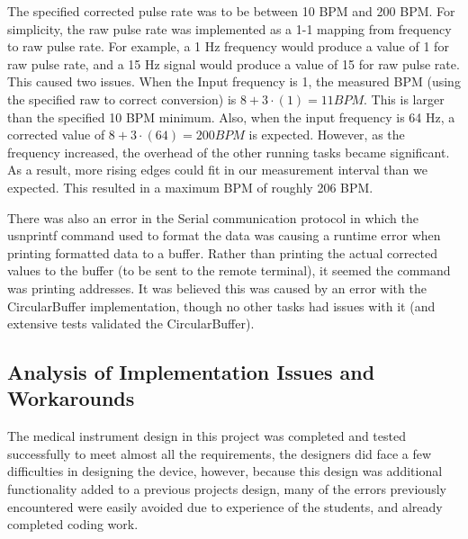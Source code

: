 \documentclass[12pt]{article} %
\begin{document}
    The specified corrected pulse rate was to be between 10 BPM and 200 BPM.
    For simplicity, the raw pulse rate was implemented as a 1-1 mapping from
    frequency to raw pulse rate.  For example, a 1 Hz frequency would produce a
    value of 1 for raw pulse rate, and a 15 Hz signal would produce a value of
    15 for raw pulse rate.  This caused two issues.  When the Input frequency
    is 1, the measured BPM (using the specified raw to correct conversion) is
    $8 + 3\cdot(1) = 11 BPM$.  This is larger than the specified 10 BPM
    minimum.  Also, when the input frequency is 64 Hz, a corrected value of 
    $8 + 3\cdot(64) = 200 BPM$ is expected.  However, as the frequency
    increased, the overhead of the other running tasks became significant.
    As a result, more rising edges could fit in our measurement interval
    than we expected.  This resulted in a maximum BPM of roughly 206 BPM.

    There was also an error in the Serial communication protocol in which the
    usnprintf command used to format the data was causing a runtime error when
    printing formatted data to a buffer.  Rather than printing the actual
    corrected values to the buffer (to be sent to the remote terminal), it
    seemed the command was printing addresses.  It was believed this was
    caused by an error with the CircularBuffer implementation, though no
    other tasks had issues with it (and extensive tests validated the 
    CircularBuffer).  

    \subsection{Analysis of Implementation Issues and Workarounds}



    The medical instrument design in this project was completed and tested
    successfully to meet almost all the requirements, the designers did face a
    few difficulties in designing the device, however, because this design was
    additional functionality added to a previous projects design, many of the
    errors previously encountered were easily avoided due to experience of the
    students, and already completed coding work.
    
\end{document}
